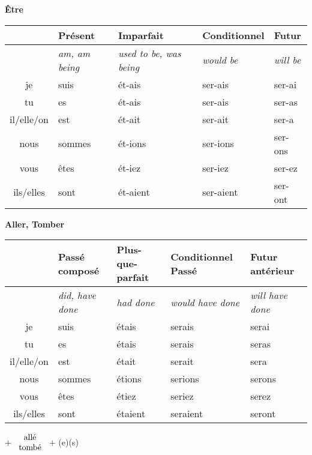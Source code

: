 \vskip 1.0cm
\begin{flushleft}
\textbf{\^Etre}
\vskip 0.1cm
\begin{tabular}{|c||L{2.5cm}|L{2.5cm}|L{2.5cm}|L{2.5cm}|}
\hline
& Pr\'esent & Imparfait & Conditionnel & Futur \\
\hline
& \textit{am, am being} & \textit{used to be, was being} & \textit{would be} & \textit{will be} \\
\hline\hline
je            &	suis	&	\'et-ais	&	ser-ais	 &	ser-ai	\\
tu            &	es 	&	\'et-ais	&	ser-ais	&	ser-as	\\
il/elle/on  &	est	&	\'et-ait	&	ser-ait	&	ser-a	\\
nous       &	sommes	&	\'et-ions	&	ser-ions	&	ser-ons	\\
vous       &	\^etes	&	\'et-iez	&	ser-iez		&	ser-ez	\\
ils/elles   &	sont 	&	\'et-aient	&	ser-aient	&	ser-ont	\\
\hline
\end{tabular}
\end{flushleft}

\begin{flushleft}
\textbf{Aller, Tomber}
\vskip 0.1cm
\begin{tabular}{|c||L{2.5cm}|L{2.5cm}|L{2.5cm}|L{2.5cm}|}
\hline
& Pass\'e compos\'e & Plus-que-parfait & Conditionnel Pass\'e & Futur ant\'erieur \\
\hline
& \textit{did, have done} & \textit{had done} & \textit{would have done} & \textit{will have done} \\
\hline\hline
je            &	suis	&	\'etais	&	serais	 &	serai	\\
tu            &	es 	&	\'etais	&	serais	&	seras	\\
il/elle/on  &	est	&	\'etait	&	serait	&	sera	\\
nous       &	sommes	&	\'etions	&	serions	&	serons	\\
vous       &	\^etes	&	\'etiez	&	seriez		&	serez	\\
ils/elles   &	sont 	&	\'etaient	&	seraient	&	seront	\\
\hline
\end{tabular}
\;$+$
$\begin{array}{c}
\textnormal{all\'e}
\\
\textnormal{tomb\'e}
\end{array}$
$+$ (e)(s)
\end{flushleft}


